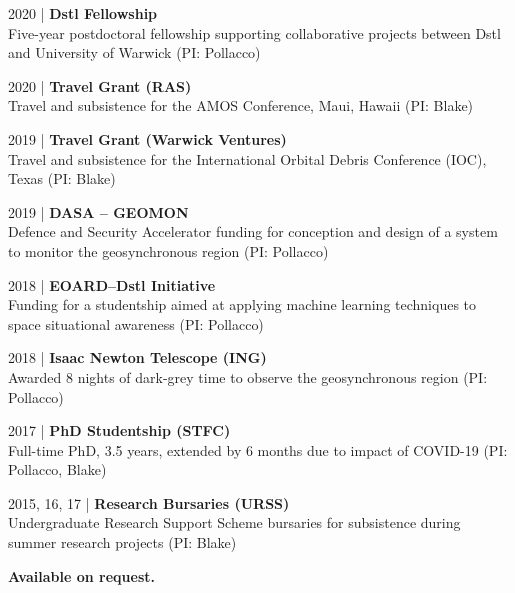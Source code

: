 
\justify
\vspace{-1em}
\small 2020 | \textbf{Dstl Fellowship} \\
Five-year postdoctoral fellowship supporting collaborative projects between Dstl and University of Warwick (PI: Pollacco)

\divider

\small 2020 | \textbf{Travel Grant (RAS)} \\
Travel and subsistence for the AMOS Conference, Maui, Hawaii (PI: Blake)

\divider

\small 2019 | \textbf{Travel Grant (Warwick Ventures)} \\
Travel and subsistence for the International Orbital Debris Conference (IOC), Texas (PI: Blake)

\divider

\small 2019 | \textbf{DASA -- GEOMON} \\
Defence and Security Accelerator funding for conception and design of a system to monitor the geosynchronous region (PI: Pollacco)

\divider

\small 2018 | \textbf{EOARD--Dstl Initiative} \\
Funding for a studentship aimed at applying machine learning techniques to space situational awareness (PI: Pollacco)

\divider

\small 2018 | \textbf{Isaac Newton Telescope (ING)} \\
Awarded 8 nights of dark-grey time to observe the geosynchronous region (PI: Pollacco)

\divider

\small 2017 | \textbf{PhD Studentship (STFC)} \\
Full-time PhD, 3.5 years, extended by 6 months due to impact of COVID-19 (PI: Pollacco, Blake)

\divider

\small 2015, 16, 17 | \textbf{Research Bursaries (URSS)} \\
Undergraduate Research Support Scheme bursaries for subsistence during summer research projects (PI: Blake)

\medskip


\normalsize \textbf{Available on request.}